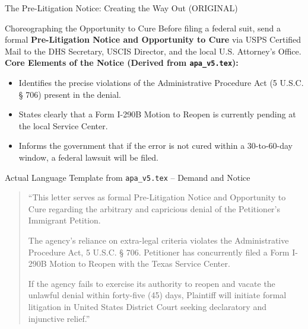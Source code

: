\documentclass[11pt]{beamer}
\begin{document}
	\begin{frame}[allowframebreaks]{The Pre-Litigation Notice: Creating the Way Out (ORIGINAL)}
		\scriptsize
		\begin{block}{Choreographing the Opportunity to Cure}
			Before filing a federal suit, send a formal \textbf{Pre-Litigation Notice and Opportunity to Cure} via USPS Certified Mail to the DHS Secretary, USCIS Director, and the local U.S. Attorney's Office.
			\vspace{0.15cm}
			\textbf{Core Elements of the Notice (Derived from \texttt{apa\_v5.tex}):}
			\begin{itemize}
				\item Identifies the precise violations of the Administrative Procedure Act (5 U.S.C. § 706) present in the denial.
				\item States clearly that a Form I-290B Motion to Reopen is currently pending at the local Service Center.
				\item Informs the government that if the error is not cured within a 30-to-60-day window, a federal lawsuit will be filed.
			\end{itemize}
		\end{block}
		\framebreak
		\begin{block}{Actual Language Template from \texttt{apa\_v5.tex} -- Demand and Notice}
			\begin{quote}
				``This letter serves as formal Pre-Litigation Notice and Opportunity to Cure regarding the arbitrary and capricious denial of the Petitioner’s Immigrant Petition. 
				
				The agency’s reliance on extra-legal criteria violates the Administrative Procedure Act, 5 U.S.C. § 706. Petitioner has concurrently filed a Form I-290B Motion to Reopen with the Texas Service Center. 
				
				If the agency fails to exercise its authority to reopen and vacate the unlawful denial within forty-five (45) days, Plaintiff will initiate formal litigation in United States District Court seeking declaratory and injunctive relief.''
			\end{quote}
		\end{block}
	\end{frame}
	
\end{document}
